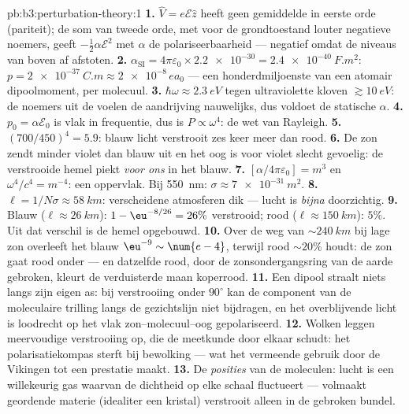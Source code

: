\begin{solution}{pb:b3:perturbation-theory:1}
\textbf{1.} $\hat V = e\mathcal E\hat z$ heeft geen gemiddelde in eerste
orde (pariteit); de som van tweede orde, met voor de grondtoestand louter
negatieve noemers, geeft $-\tfrac12\alpha\mathcal E^2$ met $\alpha$ de
polariseerbaarheid --- negatief omdat de niveaus van boven af afstoten.
\textbf{2.} $\alpha_{\text{SI}} = 4\pi\varepsilon_0 \times
\num{2.2e-30} = \qty{2.4e-40}{F.m^2}$: $p = \qty{2e-37}{C.m}
\approx \num{2e-8}\,ea_0$ --- een honderdmiljoenste van een atomair
dipoolmoment, per molecuul.
\textbf{3.} $\hbar\omega \approx \qty{2.3}{eV}$ tegen ultraviolette
kloven $\gtrsim\qty{10}{eV}$: de noemers uit de  voelen de
aandrijving nauwelijks, dus voldoet de statische $\alpha$.
\textbf{4.} $p_0 = \alpha\mathcal E_0$ is vlak in frequentie, dus is $P
\propto \omega^4$: de wet van Rayleigh.
\textbf{5.} $(700/450)^4 = 5.9$: blauw licht verstrooit zes keer meer dan
rood.
\textbf{6.} De zon zendt minder violet dan blauw uit en het oog is voor
violet slecht gevoelig: de verstrooide hemel piekt \emph{voor ons} in het
blauw.
\textbf{7.} $[\alpha/4\pi\varepsilon_0] = \unit{m^3}$ en
$\omega^4/c^4 = \unit{m^{-4}}$: een oppervlak. Bij \qty{550}{nm}:
$\sigma \approx \qty{7e-31}{m^2}$.
\textbf{8.} $\ell = 1/N\sigma \approx \qty{58}{km}$: verscheidene
atmosferen dik --- lucht is \emph{bijna} doorzichtig.
\textbf{9.} Blauw ($\ell \approx \qty{26}{km}$): $1 -
\eu^{-8/26} = 26\%$
verstrooid; rood ($\ell \approx \qty{150}{km}$): $5\%$. Uit dat verschil
is de hemel opgebouwd.
\textbf{10.} Over de weg van $\sim\qty{240}{km}$ bij lage zon overleeft
het blauw $\eu^{-9} \sim \num{e-4}$, terwijl rood $\sim20\%$ houdt: de zon
gaat rood onder --- en datzelfde rood, door de zonsondergangsring van de
aarde gebroken, kleurt de verduisterde maan koperrood.
\textbf{11.} Een dipool straalt niets langs zijn eigen as: bij
verstrooiing onder $90^\circ$ kan de component van de moleculaire
trilling langs de gezichtslijn niet bijdragen, en het overblijvende licht
is loodrecht op het vlak zon--molecuul--oog gepolariseerd.
\textbf{12.} Wolken leggen meervoudige verstrooiing op, die de meetkunde
door elkaar schudt: het polarisatiekompas sterft bij bewolking --- wat het
vermeende gebruik door de Vikingen tot een prestatie maakt.
\textbf{13.} De \emph{posities} van de moleculen: lucht is een
willekeurig gas waarvan de dichtheid op elke schaal fluctueert ---
volmaakt geordende materie (idealiter een kristal) verstrooit alleen in de
gebroken bundel.

\end{solution}
